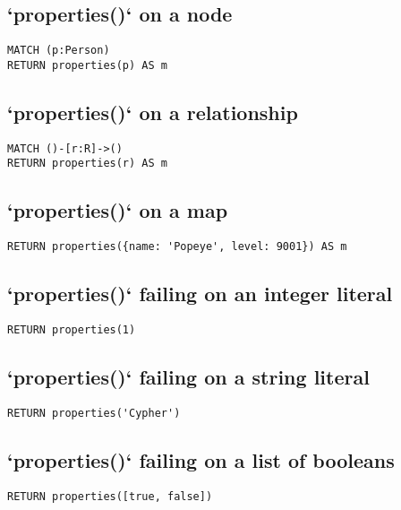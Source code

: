 \subsection{`properties()` on a node}

\begin{lstlisting}
MATCH (p:Person)
RETURN properties(p) AS m
\end{lstlisting}

\subsection{`properties()` on a relationship}

\begin{lstlisting}
MATCH ()-[r:R]->()
RETURN properties(r) AS m
\end{lstlisting}

\subsection{`properties()` on a map}

\begin{lstlisting}
RETURN properties({name: 'Popeye', level: 9001}) AS m
\end{lstlisting}

\subsection{`properties()` failing on an integer literal}

\begin{lstlisting}
RETURN properties(1)
\end{lstlisting}

\subsection{`properties()` failing on a string literal}

\begin{lstlisting}
RETURN properties('Cypher')
\end{lstlisting}

\subsection{`properties()` failing on a list of booleans}

\begin{lstlisting}
RETURN properties([true, false])
\end{lstlisting}

